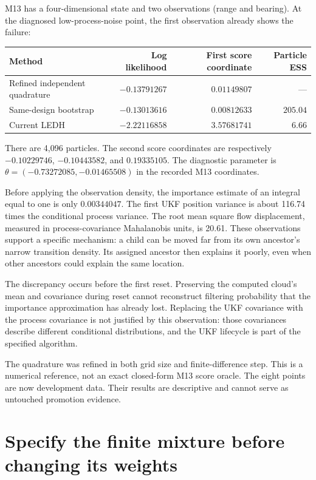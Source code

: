\documentclass[11pt]{article}
\begin{document}
M13 has a four-dimensional state and two observations (range and bearing).
At the diagnosed low-process-noise point, the first observation already shows
the failure:
\begin{center}
\begin{tabular}{lrrr}
\toprule
Method & Log likelihood & First score coordinate & Particle ESS\\
\midrule
Refined independent quadrature & $-0.13791267$ & $0.01149807$ & ---\\
Same-design bootstrap & $-0.13013616$ & $0.00812633$ & $205.04$\\
Current LEDH & $-2.22116858$ & $3.57681741$ & $6.66$\\
\bottomrule
\end{tabular}
\end{center}
There are 4,096 particles. The second score coordinates are respectively
$-0.10229746$, $-0.10443582$, and $0.19335105$.
The diagnostic parameter is
$\theta=(-0.73272085,-0.01465508)$ in the recorded M13 coordinates.

Before applying the observation density, the importance estimate of an
integral equal to one is only $0.00344047$. The first UKF position variance
is about 116.74 times the conditional process variance. The root mean square
flow displacement, measured in process-covariance Mahalanobis units, is
20.61. These observations support a specific mechanism: a child can be moved
far from its own ancestor's narrow transition density. Its assigned
ancestor then explains it poorly, even when other ancestors could explain
the same location.

The discrepancy occurs before the first reset. Preserving the computed
cloud's mean and covariance during reset cannot reconstruct filtering
probability that the importance approximation has already lost.
Replacing the UKF covariance with the process covariance is not justified
by this observation: those covariances describe different conditional
distributions, and the UKF lifecycle is part of the specified algorithm.

The quadrature was refined in both grid size and finite-difference step.
This is a numerical reference, not an exact closed-form M13 score oracle.
The eight points are now development data. Their results are descriptive
and cannot serve as untouched promotion evidence.

\section{Specify the finite mixture before changing its weights}
\end{document}
